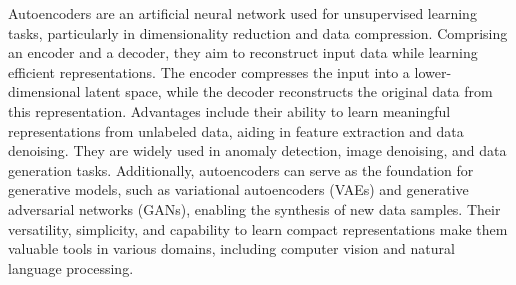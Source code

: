 Autoencoders are an artificial neural network used for unsupervised learning tasks, particularly in dimensionality reduction and data compression. Comprising an encoder and a decoder, they aim to reconstruct input data while learning efficient representations. The encoder compresses the input into a lower-dimensional latent space, while the decoder reconstructs the original data from this representation. Advantages include their ability to learn meaningful representations from unlabeled data, aiding in feature extraction and data denoising. They are widely used in anomaly detection, image denoising, and data generation tasks. Additionally, autoencoders can serve as the foundation for generative models, such as variational autoencoders (VAEs) and generative adversarial networks (GANs), enabling the synthesis of new data samples. Their versatility, simplicity, and capability to learn compact representations make them valuable tools in various domains, including computer vision and natural language processing.

